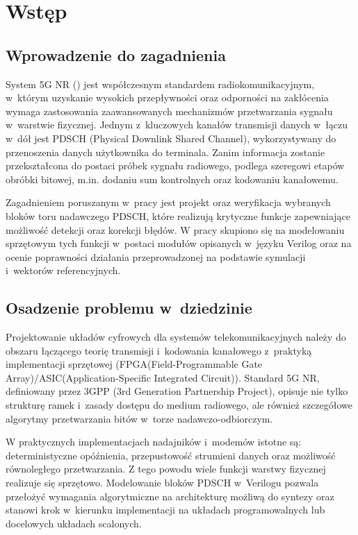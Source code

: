 \chapter{Wstęp}
\label{ch:wstep}

\section{Wprowadzenie do zagadnienia}
\label{sec:wstep_wprowadzenie}
System 5G NR () jest współczesnym standardem radiokomunikacyjnym, w~którym uzyskanie wysokich przepływności oraz odporności na zakłócenia wymaga zastosowania zaawansowanych mechanizmów przetwarzania sygnału w~warstwie fizycznej. Jednym z~kluczowych kanałów transmisji danych w~łączu w~dół jest PDSCH (Physical Downlink Shared Channel), wykorzystywany do przenoszenia danych użytkownika do terminala. Zanim informacja zostanie przekształcona do postaci próbek sygnału radiowego, podlega szeregowi etapów obróbki bitowej, m.in. dodaniu sum kontrolnych oraz kodowaniu kanałowemu.

Zagadnieniem poruszanym w~pracy jest projekt oraz weryfikacja wybranych bloków toru nadawczego PDSCH, które realizują krytyczne funkcje zapewniające możliwość detekcji oraz korekcji błędów. W pracy skupiono się na modelowaniu sprzętowym tych funkcji w~postaci modułów opisanych w~języku Verilog oraz na ocenie poprawności działania przeprowadzonej na podstawie symulacji i~wektorów referencyjnych.

\section{Osadzenie problemu w~dziedzinie}
\label{sec:wstep_osadzenie}
Projektowanie układów cyfrowych dla systemów telekomunikacyjnych należy do obszaru łączącego teorię transmisji i~kodowania kanałowego z~praktyką implementacji sprzętowej (FPGA(Field-Programmable Gate Array)/ASIC(Application-Specific Integrated Circuit)). Standard 5G NR, definiowany przez 3GPP (3rd Generation Partnership Project), opisuje nie tylko strukturę ramek i~zasady dostępu do medium radiowego, ale również szczegółowe algorytmy przetwarzania bitów w~torze nadawczo-odbiorczym.

W praktycznych implementacjach nadajników i~modemów istotne są: deterministyczne opóźnienia, przepustowość strumieni danych oraz możliwość równoległego przetwarzania. Z tego powodu wiele funkcji warstwy fizycznej realizuje się sprzętowo. Modelowanie bloków PDSCH w~Verilogu pozwala przełożyć wymagania algorytmiczne na architekturę możliwą do syntezy oraz stanowi krok w~kierunku implementacji na układach programowalnych lub docelowych układach scalonych.

